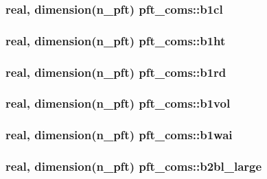 \subsubsection[{b1cl}]{\setlength{\rightskip}{0pt plus 5cm}real, dimension(n\+\_\+pft) pft\+\_\+coms\+::b1cl}\label{namespacepft__coms_ad31da22766c6db6bf3f24498eab8d22d}
\hypertarget{namespacepft__coms_a00f748893c4f7254524515d560a16eee}{}
\subsubsection[{b1ht}]{\setlength{\rightskip}{0pt plus 5cm}real, dimension(n\+\_\+pft) pft\+\_\+coms\+::b1ht}\label{namespacepft__coms_a00f748893c4f7254524515d560a16eee}
\hypertarget{namespacepft__coms_a012ba0e0102bf2d9db7ef42b187326d5}{}
\subsubsection[{b1rd}]{\setlength{\rightskip}{0pt plus 5cm}real, dimension(n\+\_\+pft) pft\+\_\+coms\+::b1rd}\label{namespacepft__coms_a012ba0e0102bf2d9db7ef42b187326d5}
\hypertarget{namespacepft__coms_a44136dea8d02d3eba884e01b192a6895}{}
\subsubsection[{b1vol}]{\setlength{\rightskip}{0pt plus 5cm}real, dimension(n\+\_\+pft) pft\+\_\+coms\+::b1vol}\label{namespacepft__coms_a44136dea8d02d3eba884e01b192a6895}
\hypertarget{namespacepft__coms_ad8ddc641c836a1062e3157400b675217}{}
\subsubsection[{b1wai}]{\setlength{\rightskip}{0pt plus 5cm}real, dimension(n\+\_\+pft) pft\+\_\+coms\+::b1wai}\label{namespacepft__coms_ad8ddc641c836a1062e3157400b675217}
\hypertarget{namespacepft__coms_a3047801affde1c1d10ddb8ceed1e6cb7}{}
\subsubsection[{b2bl\+\_\+large}]{\setlength{\rightskip}{0pt plus 5cm}real, dimension(n\+\_\+pft) pft\+\_\+coms\+::b2bl\+\_\+large}\label{namespacepft__coms_a3047801affde1c1d10ddb8ceed1e6cb7}
\hypertarget{namespacepft__coms_ab0d33f3125e1ddd008763f955beceb8d}{}
